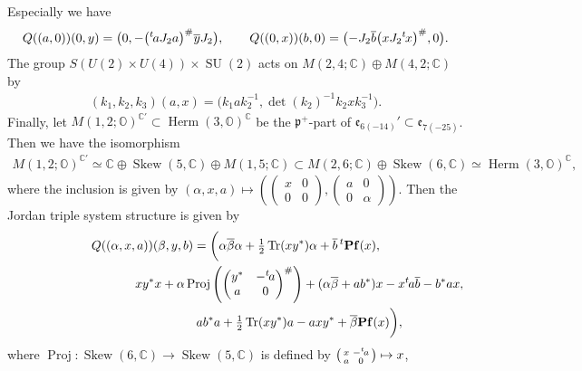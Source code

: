 \documentclass[pdftex]{sigma}
\numberwithin{equation}{section}
\newcommand{\BC}{\mathbb{C}}
\newcommand{\BO}{\mathbb{O}}
\newcommand{\fp}{\mathfrak{p}}
\newcommand{\Tr}{\operatorname{Tr}}
\newcommand{\Proj}{\operatorname{Proj}}
\newcommand{\Skew}{\operatorname{Skew}}
\newcommand{\Herm}{\operatorname{Herm}}
\begin{document}
Especially we have
\begin{gather*} Q((a,0))(0,y)=\big(0,-\big({}^t\hspace{-1pt}aJ_2a\big)^\#\overline{y}J_2\big),\qquad Q((0,x))(b,0)=\big({-}J_2\overline{b}\big(xJ_2{}^t\hspace{-1pt}x\big)^\#,0\big). \end{gather*}
The group $S(U(2)\times U(4))\times \operatorname{SU}(2)$ acts on $M(2,4;\BC)\oplus M(4,2;\BC)$ by
\begin{gather*} (k_1,k_2,k_3)(a,x)=\big(k_1ak_2^{-1},\det(k_2)^{-1}k_2xk_3^{-1}\big). \end{gather*}
Finally, let $M(1,2;\BO)^{\BC\prime}\subset\Herm(3,\BO)^\BC$ be the $\fp^+$-part of $\mathfrak{e}_{6(-14)}'\subset\mathfrak{e}_{7(-25)}$.
Then we have the isomorphism
\begin{gather*} M(1,2;\BO)^{\BC\prime}\simeq\BC\oplus\Skew(5,\BC)\oplus M(1,5;\BC)\subset M(2,6;\BC)\oplus\Skew(6,\BC)\simeq\Herm(3,\BO)^\BC, \end{gather*}
where the inclusion is given by
$(\alpha,x,a)\mapsto \left(\left(\begin{smallmatrix}x&0\\0&0\end{smallmatrix}\right),\left(\begin{smallmatrix}a&0\\0&\alpha\end{smallmatrix}\right)\right)$.
Then the Jordan triple system structure is given by
\begin{gather*}
Q((\alpha,x,a))(\beta,y,b)=\bigg(\alpha\overline{\beta}\alpha+\tfrac{1}{2}\Tr(xy^*)\alpha+\overline{b}\,{}^t\mathbf{Pf}(x),\\
\hphantom{Q((\alpha,x,a))(\beta,y,b)=\bigg(}{} xy^*x+\alpha\Proj\left(\begin{pmatrix}y^*&-{}^t\hspace{-1pt}a\\a&0\end{pmatrix}^\#\right)
+(\alpha\overline{\beta}+ab^*)x-x{}^t\hspace{-1pt}a\overline{b}-b^*ax,\\
\hphantom{Q((\alpha,x,a))(\beta,y,b)=\bigg(}{} ab^*a+\tfrac{1}{2}\Tr(xy^*)a-axy^*+\overline{\beta}\mathbf{Pf}(x)\bigg),
\end{gather*}
where $\Proj\colon \Skew(6,\BC)\to\Skew(5,\BC)$ is defined by $\left(\begin{smallmatrix}x&-{}^t\hspace{-1pt}a\\a&0\end{smallmatrix}\right)\mapsto x$,
\end{document}
